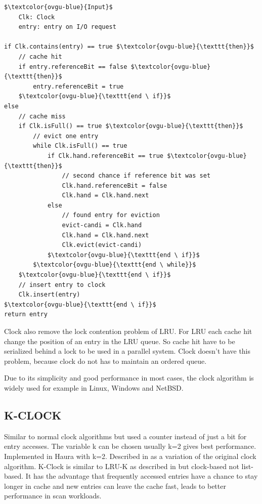 \documentclass[
	12pt,
	a4paper,
	abstract,
	bibliography=totoc,
	chapterprefix,
	headings=openright,
	numbers=endperiod,
	parskip=half,
	twoside,
]{scrreprt}
\begin{document}
\newpage
\begin{lstlisting}[mathescape=true,caption=Clock replacement algorithm in pseudocode,label=lst:clock-algorithm]
$\textcolor{ovgu-blue}{Input}$
	Clk: Clock
	entry: entry on I/O request

if Clk.contains(entry) == true $\textcolor{ovgu-blue}{\texttt{then}}$
	// cache hit
	if entry.referenceBit == false $\textcolor{ovgu-blue}{\texttt{then}}$
		entry.referenceBit = true
	$\textcolor{ovgu-blue}{\texttt{end \ if}}$
else
	// cache miss
	if Clk.isFull() == true $\textcolor{ovgu-blue}{\texttt{then}}$
		// evict one entry
		while Clk.isFull() == true
			if Clk.hand.referenceBit == true $\textcolor{ovgu-blue}{\texttt{then}}$
				// second chance if reference bit was set
				Clk.hand.referenceBit = false
				Clk.hand = Clk.hand.next
			else
				// found entry for eviction 
				evict-candi = Clk.hand
				Clk.hand = Clk.hand.next
				Clk.evict(evict-candi)
			$\textcolor{ovgu-blue}{\texttt{end \ if}}$
		$\textcolor{ovgu-blue}{\texttt{end \ while}}$
	$\textcolor{ovgu-blue}{\texttt{end \ if}}$
	// insert entry to clock
	Clk.insert(entry)
$\textcolor{ovgu-blue}{\texttt{end \ if}}$	
return entry 
\end{lstlisting}

Clock also remove the lock contention problem of LRU.
For LRU each cache hit change the position of an entry in the LRU queue.
So cache hit have to be serialized behind a lock to be used in a parallel system.
Clock doesn't have this problem, because clock do not has to maintain an ordered queue.

Due to its simplicity and good performance in most cases, the clock algorithm is widely used for example in Linux, Windows and NetBSD.



\subsection{K-CLOCK}

Similar to normal clock algorithms but used a counter instead of just a bit for entry accesses.
The variable k can be chosen usually k=2 gives best performance.
Implemented in Haura with k=2.
Described in \cite{corbato1968paging} as a variation of the original clock algorithm.
K-Clock is similar to LRU-K as described in \cite{o1993lru} but clock-based not list-based.
It has the advantage that frequently accessed entries have a chance to stay longer in cache and new entries can leave the cache fast, leads to better performance in scan workloads.
\end{document}
